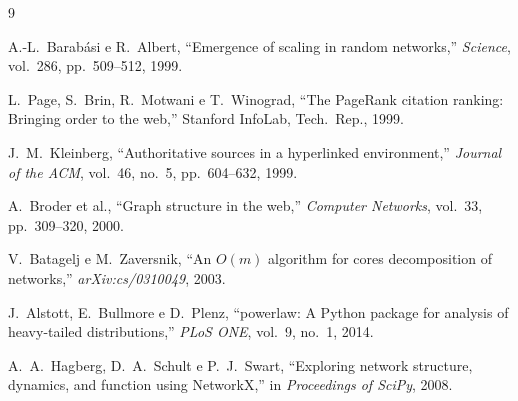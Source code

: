 \documentclass[12pt,a4paper]{article}
\begin{document}
\begin{thebibliography}{9}

A.-L.\ Barabási e R.\ Albert, ``Emergence of scaling in random networks,'' \textit{Science}, vol.~286, pp.~509--512, 1999.

L.\ Page, S.\ Brin, R.\ Motwani e T.\ Winograd, ``The PageRank citation ranking: Bringing order to the web,'' Stanford InfoLab, Tech.\ Rep., 1999.

J.\ M.\ Kleinberg, ``Authoritative sources in a hyperlinked environment,'' \textit{Journal of the ACM}, vol.~46, no.~5, pp.~604--632, 1999.

A.\ Broder et al., ``Graph structure in the web,'' \textit{Computer Networks}, vol.~33, pp.~309--320, 2000.

V.\ Batagelj e M.\ Zaversnik, ``An $O(m)$ algorithm for cores decomposition of networks,'' \textit{arXiv:cs/0310049}, 2003.

J.\ Alstott, E.\ Bullmore e D.\ Plenz, ``powerlaw: A Python package for analysis of heavy-tailed distributions,'' \textit{PLoS ONE}, vol.~9, no.~1, 2014.

A.\ A.\ Hagberg, D.\ A.\ Schult e P.\ J.\ Swart, ``Exploring network structure, dynamics, and function using NetworkX,'' in \textit{Proceedings of SciPy}, 2008.

\end{thebibliography}
\end{document}
